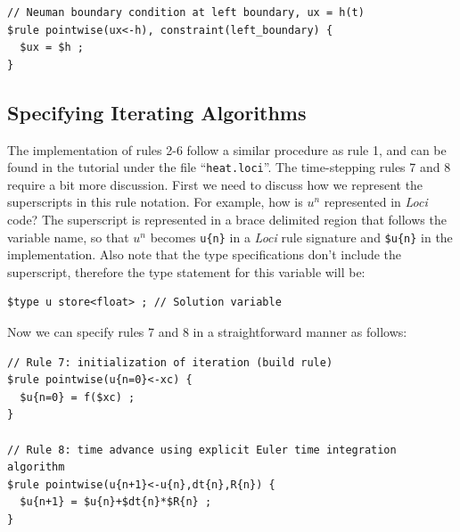 \documentclass[10pt,epsf,letterpaper,twoside]{book}
\begin{document}
\begin{verbatim}
// Neuman boundary condition at left boundary, ux = h(t)
$rule pointwise(ux<-h), constraint(left_boundary) {
  $ux = $h ;
}
\end{verbatim}

\subsection{Specifying Iterating Algorithms}
The implementation of rules 2-6 follow a similar procedure as rule 1,
and can be found in the tutorial under the file ``{\tt heat.loci}''.
The time-stepping rules 7 and 8 require a bit more discussion.  First
we need to discuss how we represent the superscripts in this rule
notation.  For example, how is $u^n$ represented in {\it Loci} code?  The
superscript is represented in a brace delimited region that follows the
variable name, so that $u^n$ becomes {\tt u\{n\}} in a {\it Loci} rule
signature and {\tt \$u\{n\}} in the implementation. Also note that the
type specifications don't include the superscript, therefore the type
statement for this variable will be:
\begin{verbatim}
$type u store<float> ; // Solution variable
\end{verbatim}

Now we can specify rules 7 and 8 in a straightforward manner as follows:
\begin{verbatim}
// Rule 7: initialization of iteration (build rule)
$rule pointwise(u{n=0}<-xc) {
  $u{n=0} = f($xc) ;
}

// Rule 8: time advance using explicit Euler time integration algorithm
$rule pointwise(u{n+1}<-u{n},dt{n},R{n}) {
  $u{n+1} = $u{n}+$dt{n}*$R{n} ;
}
\end{verbatim}
\end{document}
